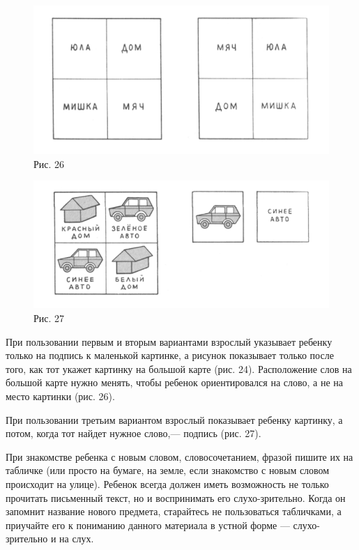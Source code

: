 \documentclass[a5paper]{book}
\begin{document}
\begin{figure}
\centering
\includegraphics[width=\linewidth]{media/media/image23.png}
\caption*{Рис. 26}
\end{figure}

\begin{figure}
\centering
\includegraphics[width=\linewidth]{media/media/image24.png}
\caption*{Рис. 27}
\end{figure}

При пользовании первым и вторым вариантами взрослый указывает ребенку
только на подпись к маленькой картинке, а рисунок показывает только
после того, как тот укажет картинку на большой карте (рис. 24).
Расположение слов на большой карте нужно менять, чтобы ребенок
ориентировался на слово, а не на место картинки (рис. 26).

При пользовании третьим вариантом взрослый показывает ребенку картинку,
а потом, когда тот найдет нужное слово,--- подпись (рис. 27).

При знакомстве ребенка с новым словом, словосочетанием, фразой пишите их
на табличке (или просто на бумаге, на земле, если знакомство с новым
словом происходит на улице). Ребенок всегда должен иметь возможность не
только прочитать письменный текст, но и воспринимать его
слухо-зрительно. Когда он запомнит название нового предмета, старайтесь
не пользоваться табличками, а приучайте его к пониманию данного
материала в устной форме --- слухо-зрительно и на слух.
\end{document}
